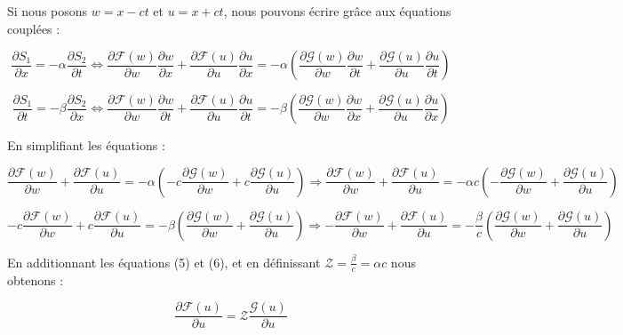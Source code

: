 Si nous posons $w = x-ct$ et $u = x+ct$, nous pouvons écrire grâce aux équations couplées : 
\begin{fullwidth}
	\[\frac{\partial S_{1}}{\partial x} = -\alpha \frac{\partial S_{2}}{\partial t} \Leftrightarrow \frac{\partial \mathcal{F}(w)}{\partial w}\frac{\partial w}{\partial x} + \frac{\partial \mathcal{F}(u)}{\partial u}\frac{\partial u}{\partial x} 
	= -\alpha \left(\frac{\partial \mathcal{G}(w)}{\partial w}\frac{\partial w}{\partial t} + \frac{\partial \mathcal{G}(u)}{\partial u}\frac{\partial u}{\partial t}\right)\]
	
	\[\frac{\partial S_{1}}{\partial t} = -\beta \frac{\partial S_{2}}{\partial x} \Leftrightarrow \frac{\partial \mathcal{F}(w)}{\partial w}\frac{\partial w}{\partial t} + \frac{\partial \mathcal{F}(u)}{\partial u}\frac{\partial u}{\partial t} 
	= -\beta \left(\frac{\partial \mathcal{G}(w)}{\partial w}\frac{\partial w}{\partial x} + \frac{\partial \mathcal{G}(u)}{\partial u}\frac{\partial u}{\partial x}\right)\]
\end{fullwidth}	
	En simplifiant les équations : 
\begin{fullwidth}	
	\begin{equation}
	\frac{\partial \mathcal{F}(w)}{\partial w} + \frac{\partial \mathcal{F}(u)}{\partial u}
	= -\alpha \left(-c \frac{\partial \mathcal{G}(w)}{\partial w} + c \frac{\partial \mathcal{G}(u)}{\partial u}\right) \Rightarrow
	\frac{\partial \mathcal{F}(w)}{\partial w} + \frac{\partial \mathcal{F}(u)}{\partial u} = -\alpha c \left(-\frac{\partial \mathcal{G}(w)}{\partial w} +\frac{\partial \mathcal{G}(u)}{\partial u}\right) 
	\end{equation}
	
	\begin{equation}
	-c \frac{\partial \mathcal{F}(w)}{\partial w} + c \frac{\partial \mathcal{F}(u)}{\partial u}
	= -\beta \left(\frac{\partial \mathcal{G}(w)}{\partial w} + \frac{\partial \mathcal{G}(u)}{\partial u}\right) \Rightarrow -\frac{\partial \mathcal{F}(w)}{\partial w} + \frac{\partial \mathcal{F}(u)}{\partial u}
	= -\frac{\beta}{c} \left(\frac{\partial \mathcal{G}(w)}{\partial w} + \frac{\partial \mathcal{G}(u)}{\partial u}\right)
	\end{equation}
\end{fullwidth}	

En additionnant les équations (5) et (6), et en définissant $\mathcal{Z} = \frac{\beta}{c} = \alpha c$ nous obtenons : 

\begin{equation}
 \frac{\partial \mathcal{F}(u)}{\partial u} =  \mathcal{Z} \frac{\mathcal{G}(u)}{\partial u}
\end{equation}

